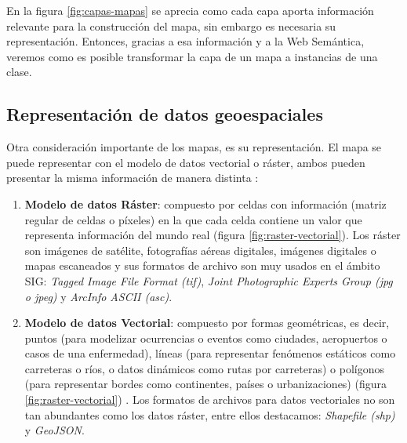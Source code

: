 En la figura \ref{fig:capas-mapas} se aprecia como cada capa aporta información relevante para la construcción del mapa, sin embargo es necesaria su representación. Entonces, gracias a esa información y a la Web Semántica, veremos como es posible transformar la capa de un mapa a instancias de una clase.

\subsection{Representación de datos geoespaciales}


Otra consideración importante de los mapas, es su representación. El mapa se puede representar con el modelo de datos vectorial o ráster, ambos pueden presentar la misma información de manera distinta \cite{tipos-datos-sig}:

\begin{enumerate}
	\item \textbf{Modelo de datos Ráster}: compuesto por celdas con información (matriz regular de celdas o píxeles) en la que cada celda contiene un valor que representa información del mundo real (figura \ref{fig:raster-vectorial}). Los ráster son imágenes de satélite, fotografías aéreas digitales, imágenes digitales o mapas escaneados \cite{raster} y sus formatos de archivo son muy usados en el ámbito SIG: \textit{Tagged Image File Format (tif)}, \textit{Joint Photographic Experts Group (jpg o jpeg)} y \textit{ArcInfo ASCII (asc)}.
	
	\item \textbf{Modelo de datos Vectorial}: compuesto por formas geométricas, es decir, puntos (para modelizar ocurrencias o eventos como ciudades, aeropuertos o casos de una enfermedad), líneas (para representar fenómenos estáticos como carreteras o ríos, o datos dinámicos como rutas por carreteras) o polígonos (para representar bordes como continentes, países o urbanizaciones) (figura \ref{fig:raster-vectorial}) \cite{AsignaturaSIG}. Los formatos de archivos para datos vectoriales no son tan abundantes como los datos ráster, entre ellos destacamos: \textit{Shapefile (shp)} y \textit{GeoJSON}.
	
\end{enumerate}



